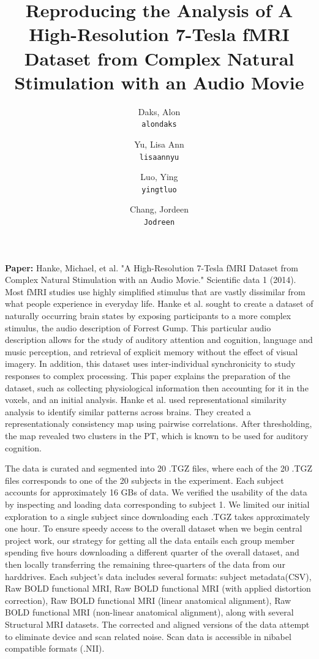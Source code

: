 \documentclass[11pt]{article}
\title{Reproducing the Analysis of A High-Resolution 7-Tesla fMRI Dataset from Complex 
Natural Stimulation with an Audio Movie}
\author{
  Daks, Alon\\
  \texttt{alondaks}
  \and
  Yu, Lisa Ann\\
  \texttt{lisaannyu}
  \and
  Luo, Ying\\
  \texttt{yingtluo}
  \and
  Chang, Jordeen\\
  \texttt{Jodreen}
}
\begin{document}
\maketitle


\textbf{Paper:} Hanke, Michael, et al. "A High-Resolution 7-Tesla fMRI Dataset from Complex 
Natural Stimulation with an Audio Movie." Scientific data 1 (2014).
\newline
\newline    
\indent Most fMRI studies use highly simplified stimulus that are vastly dissimilar
from what people experience in everyday life.  Hanke et al. sought to create a
dataset of naturally occurring brain states by exposing participants to a 
more complex stimulus, the audio description of Forrest Gump.  This particular
audio description allows for the study of auditory attention and cognition, 
language and music perception, and retrieval of explicit memory without the
effect of visual imagery.  In addition, this dataset uses inter-individual 
synchronicity to study responses to complex processing.  This paper explains
the preparation of the dataset, such as collecting physiological information
then accounting for it in the voxels, and an initial analysis.  Hanke et al.
used representational similarity analysis to identify similar patterns
across brains.  They created a representationaly consistency map using pairwise
correlations.  After thresholding, the map revealed two clusters in the PT,
which is known to be used for auditory cognition.

The data is curated and segmented into 20 .TGZ files, where each of the 20 .TGZ files corresponds to one of the 20 subjects in the experiment. Each subject accounts for approximately 16 GBs of data. We verified the usability of the data by inspecting and loading data corresponding to subject 1. We limited our initial exploration to a single subject since downloading each .TGZ takes approximately one hour. To ensure speedy access to the overall dataset when we begin central project work, our strategy for getting all the data entails each group member spending five hours downloading a different quarter of the overall dataset, and then locally transferring the remaining three-quarters of the data from our harddrives. Each subject's data includes several formats: subject metadata(CSV), Raw BOLD functional MRI, Raw BOLD functional MRI (with applied distortion correction), Raw BOLD functional MRI (linear anatomical alignment), Raw BOLD functional MRI (non-linear anatomical alignment), along with several Structural MRI datasets. The corrected and aligned versions of the data attempt to eliminate device and scan related noise. Scan data is accessible in nibabel compatible formats (.NII).
\end{document}
